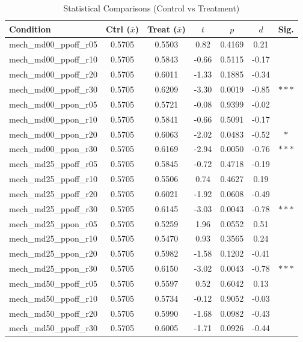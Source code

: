 \begin{table}[htbp]
\centering
\caption{Statistical Comparisons (Control vs Treatment)}
\label{tab:stats}
\begin{tabular}{lcccccc}
\toprule
Condition & Ctrl ($\bar{x}$) & Treat ($\bar{x}$) & $t$ & $p$ & $d$ & Sig. \\
\midrule
  mech\_md00\_ppoff\_r05 & 0.5705 & 0.5503 & 0.82 & 0.4169 & 0.21 &  \\
  mech\_md00\_ppoff\_r10 & 0.5705 & 0.5843 & -0.66 & 0.5115 & -0.17 &  \\
  mech\_md00\_ppoff\_r20 & 0.5705 & 0.6011 & -1.33 & 0.1885 & -0.34 &  \\
  mech\_md00\_ppoff\_r30 & 0.5705 & 0.6209 & -3.30 & 0.0019 & -0.85 & $***$ \\
  mech\_md00\_ppon\_r05 & 0.5705 & 0.5721 & -0.08 & 0.9399 & -0.02 &  \\
  mech\_md00\_ppon\_r10 & 0.5705 & 0.5841 & -0.66 & 0.5091 & -0.17 &  \\
  mech\_md00\_ppon\_r20 & 0.5705 & 0.6063 & -2.02 & 0.0483 & -0.52 & $*$ \\
  mech\_md00\_ppon\_r30 & 0.5705 & 0.6169 & -2.94 & 0.0050 & -0.76 & $***$ \\
  mech\_md25\_ppoff\_r05 & 0.5705 & 0.5845 & -0.72 & 0.4718 & -0.19 &  \\
  mech\_md25\_ppoff\_r10 & 0.5705 & 0.5506 & 0.74 & 0.4627 & 0.19 &  \\
  mech\_md25\_ppoff\_r20 & 0.5705 & 0.6021 & -1.92 & 0.0608 & -0.49 &  \\
  mech\_md25\_ppoff\_r30 & 0.5705 & 0.6145 & -3.03 & 0.0043 & -0.78 & $***$ \\
  mech\_md25\_ppon\_r05 & 0.5705 & 0.5259 & 1.96 & 0.0552 & 0.51 &  \\
  mech\_md25\_ppon\_r10 & 0.5705 & 0.5470 & 0.93 & 0.3565 & 0.24 &  \\
  mech\_md25\_ppon\_r20 & 0.5705 & 0.5982 & -1.58 & 0.1202 & -0.41 &  \\
  mech\_md25\_ppon\_r30 & 0.5705 & 0.6150 & -3.02 & 0.0043 & -0.78 & $***$ \\
  mech\_md50\_ppoff\_r05 & 0.5705 & 0.5597 & 0.52 & 0.6042 & 0.13 &  \\
  mech\_md50\_ppoff\_r10 & 0.5705 & 0.5734 & -0.12 & 0.9052 & -0.03 &  \\
  mech\_md50\_ppoff\_r20 & 0.5705 & 0.5990 & -1.68 & 0.0982 & -0.43 &  \\
  mech\_md50\_ppoff\_r30 & 0.5705 & 0.6005 & -1.71 & 0.0926 & -0.44 &  \\

\end{tabular}
\end{table}
